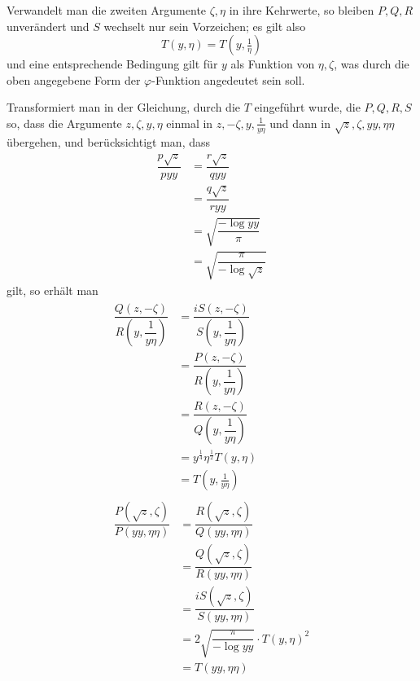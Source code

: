 Verwandelt man die zweiten Argumente $\zeta,\allowbreak \eta$ in ihre Kehrwerte, so bleiben $P,\allowbreak Q,\allowbreak R$ unverändert und $S$ wechselt nur sein Vorzeichen; es gilt also
\[
T(y,\eta)=T(y,\tfrac{1}{\eta})
\]
und eine entsprechende Bedingung gilt für $y$ als Funktion von $\eta,\allowbreak \zeta$, was durch die oben angegebene Form der $\varphi$-Funktion angedeutet sein soll.

Transformiert man in der Gleichung, durch die $T$ eingeführt wurde, die $P,\allowbreak Q,\allowbreak R,\allowbreak S$ so, dass die Argumente $z,\allowbreak \zeta,\allowbreak y,\allowbreak \eta$ einmal in $z,\allowbreak -\zeta,\allowbreak y,\allowbreak \frac{1}{y\eta}$ und dann in $\surd  z,\allowbreak \zeta,\allowbreak yy,\allowbreak \eta\eta$ übergehen, und berücksichtigt man, dass
\[
\begin{aligned}\dfrac{p\surd  z}{pyy}&=\dfrac{r\surd  z}{qyy}\\[7pt]&=\dfrac{q\surd  z}{ryy}\\[7pt]&=\surd {\dfrac{-\log yy}{\pi}}\\[7pt]&=\surd {\dfrac{\pi}{-\log\surd  z}}\end{aligned}
\]
gilt, so erhält man
\[
\begin{gathered}\begin{aligned}\dfrac{Q(z,-\zeta)}{R(y,\dfrac{1}{y\eta})}&=\dfrac{iS(z,-\zeta)}{S(y,\dfrac{1}{y\eta})}\\[7pt]&=\dfrac{P(z,-\zeta)}{R(y,\dfrac{1}{y\eta})}\\[7pt]&=\dfrac{R(z,-\zeta)}{Q(y,\dfrac{1}{y\eta})}\\[7pt]&=y^{\frac14}\eta^{\frac12}T(y,\eta)\\[7pt]&=T(y,\tfrac{1}{y\eta})\end{aligned}\\[10pt]\begin{aligned}\dfrac{P(\surd  z,\zeta)}{P(yy,\eta\eta)}&=\dfrac{R(\surd  z,\zeta)}{Q(yy,\eta\eta)}\\[7pt]&=\dfrac{Q(\surd  z,\zeta)}{R(yy,\eta\eta)}\\[7pt]&=\dfrac{iS(\surd  z,\zeta)}{S(yy,\eta\eta)}\\[7pt]&=2\surd {\dfrac{\pi}{-\log yy}}\cdot T(y,\eta)^2\\[7pt]&=T(yy,\eta\eta)\end{aligned}\end{gathered}
\]


